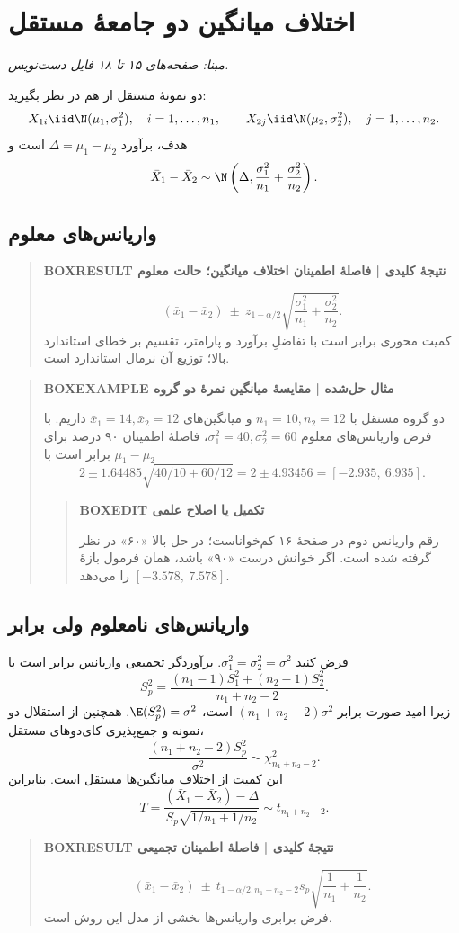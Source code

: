\section{اختلاف میانگین دو جامعهٔ مستقل}
\textit{مبنا: صفحه‌های ۱۵ تا ۱۸ فایل دست‌نویس.}\par 
دو نمونهٔ مستقل از هم در نظر بگیرید:
\[
X_{1i}\iid\N(\mu_1,\sigma_1^2),\quad i=1,\ldots,n_1,
\qquad X_{2j}\iid\N(\mu_2,\sigma_2^2),\quad j=1,\ldots,n_2.
\]
هدف، برآورد $\Delta=\mu_1-\mu_2$ است و
\[
\bar X_1-\bar X_2\sim\N\left(\Delta,\frac{\sigma_1^2}{n_1}+\frac{\sigma_2^2}{n_2}\right).
\]
\subsection{واریانس‌های معلوم}
\begin{quote}\textbf{BOXRESULT نتیجهٔ کلیدی | فاصلهٔ اطمینان اختلاف میانگین؛ حالت معلوم}\par 
\[
\boxed{(\bar x_1-\bar x_2)\ \pm\ z_{1-\alpha/2}
\sqrt{\frac{\sigma_1^2}{n_1}+\frac{\sigma_2^2}{n_2}}.}
\]
کمیت محوری برابر است با تفاضلِ برآورد و پارامتر، تقسیم بر خطای استاندارد بالا؛ توزیع آن نرمال استاندارد است.
\end{quote}
\begin{quote}\textbf{BOXEXAMPLE مثال حل‌شده | مقایسهٔ میانگین نمرهٔ دو گروه}\par 
دو گروه مستقل با $n_1=10,n_2=12$ و میانگین‌های $\bar x_1=14,\bar x_2=12$ داریم. با فرض واریانس‌های معلوم $\sigma_1^2=40,\sigma_2^2=60$، فاصلهٔ اطمینان ۹۰ درصد برای $\mu_1-\mu_2$ برابر است با
\[
2\pm1.64485\sqrt{40/10+60/12}
=2\pm4.93456=\boxed{[-2.935,\ 6.935]}.
\]
\begin{quote}\textbf{BOXEDIT تکمیل یا اصلاح علمی}\par رقم واریانس دوم در صفحهٔ ۱۶ کم‌خواناست؛ در حل بالا «۶۰» در نظر گرفته شده است. اگر خوانش درست «۹۰» باشد، همان فرمول بازهٔ $[-3.578,\ 7.578]$ را می‌دهد.\end{quote}
\end{quote}
\subsection{واریانس‌های نامعلوم ولی برابر}
فرض کنید $\sigma_1^2=\sigma_2^2=\sigma^2$. برآوردگر تجمیعی واریانس برابر است با
\[
S_p^2=\frac{(n_1-1)S_1^2+(n_2-1)S_2^2}{n_1+n_2-2}.
\]
زیرا امید صورت برابر $(n_1+n_2-2)\sigma^2$ است، $\E(S_p^2)=\sigma^2$. همچنین از استقلال دو نمونه و جمع‌پذیری کای‌دوهای مستقل،
\[
\frac{(n_1+n_2-2)S_p^2}{\sigma^2}\sim\chi^2_{n_1+n_2-2}.
\]
این کمیت از اختلاف میانگین‌ها مستقل است. بنابراین
\[
T=\frac{(\bar X_1-\bar X_2)-\Delta}
{S_p\sqrt{1/n_1+1/n_2}}\sim t_{n_1+n_2-2}.
\]
\begin{quote}\textbf{BOXRESULT نتیجهٔ کلیدی | فاصلهٔ اطمینان تجمیعی}\par 
\[
\boxed{(\bar x_1-\bar x_2)\ \pm\ t_{1-\alpha/2,n_1+n_2-2}
s_p\sqrt{\frac1{n_1}+\frac1{n_2}}.}
\]
فرض برابری واریانس‌ها بخشی از مدل این روش است.
\end{quote}
